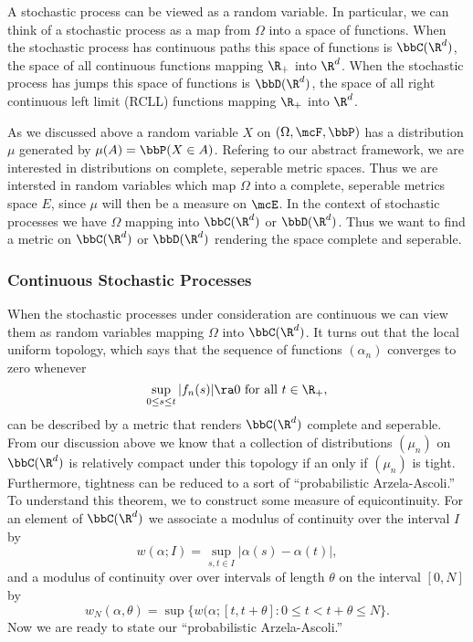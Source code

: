 \documentclass{report}
\begin{document}
A stochastic process can be viewed as a random variable.  In
particular, we can think of a stochastic process as a map from
$\Omega$ into a space of functions.  When the stochastic process has
continuous paths this space of functions is $\bbC(\R^d)$, the space of
all continuous functions mapping $\R_+$ into $\R^d$.  When the
stochastic process has jumps this space of functions is $\bbD(\R^d)$,
the space of all right continuous left limit (RCLL) functions mapping
$\R_+$ into $\R^d$.

As we discussed above a random variable $X$ on $(\Omega, \mcF, \bbP)$
has a distribution $\mu$ generated by $\mu(A) = \bbP(X \in A)$. 
Refering to our abstract framework, we are interested in distributions
on complete, seperable metric spaces.  Thus we are intersted in random
variables which map $\Omega$ into a complete, seperable metrics space
$E$, since $\mu$ will then be a measure on $\mcE$.  In the context of
stochastic processes we have $\Omega$ mapping into $\bbC(\R^d)$ or
$\bbD(\R^d)$.  Thus we want to find a metric on $\bbC(\R^d)$ or
$\bbD(\R^d)$ rendering the space complete and seperable.

\subsubsection{Continuous Stochastic Processes}

When the stochastic processes under consideration are continuous we
can view them as random variables mapping $\Omega$ into $\bbC(\R^d)$. 
It turns out that the local uniform topology, which says that the
sequence of functions $(\alpha_n)$ converges to zero whenever
\[
\sup_{0 \leq s \leq t} |f_n(s)| \ra 0 \textmd{ for all } t \in \R_+,
\]
can be described by a metric that renders $\bbC(\R^d)$ complete and
seperable.  From our discussion above we know that a collection of
distributions $(\mu_n)$ on $\bbC(\R^d)$ is relatively compact under
this topology if an only if $(\mu_n)$ is tight.  Furthermore,
tightness can be reduced to a sort of ``probabilistic Arzela-Ascoli.''  
To understand this theorem, we to construct some measure of
equicontinuity.  For an element of $\bbC(\R^d)$ we associate a modulus
of continuity over the interval $I$ by
\[
w(\alpha; I) = \sup_{s,t \in I} |\alpha(s) - \alpha(t)|,
\]
and a modulus of continuity over over intervals of length $\theta$ on
the interval $[0,N]$ by
\[
w_N(\alpha, \theta) = \sup \{ w(\alpha; [t, t+\theta] : 0 \leq t <
t+\theta \leq N\}.
\]
Now we are ready to state our ``probabilistic Arzela-Ascoli.''
\end{document}
